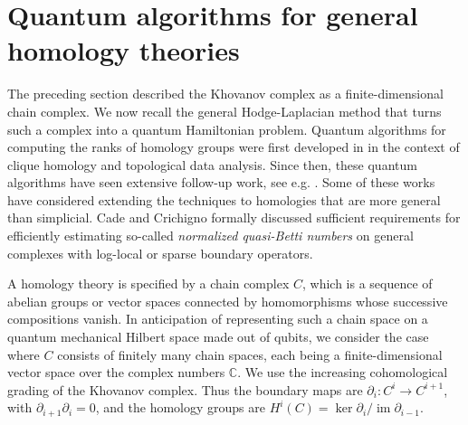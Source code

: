 \documentclass[a4paper,onecolumn,unpublished]{quantumarticle}
\theoremstyle{plain}
\theoremstyle{definition}
\theoremstyle{definition}
\numberwithin{equation}{section}
\renewcommand{\to}{\rightarrow}
\begin{document}
\section{Quantum algorithms for general homology theories}\label{sec:general_homology}
The preceding section described the Khovanov complex as a finite-dimensional chain complex. We now recall the general Hodge-Laplacian method that turns such a complex into a quantum Hamiltonian problem. Quantum algorithms for computing the ranks of homology groups were first developed in \cite{lloyd2016quantum} in the context of clique homology and topological data analysis. Since then, these quantum algorithms have seen extensive follow-up work, see e.g. \cite{quantumAdvantage,persistent,IBMresult,GoogleBettiBerry,AmazonBettiMcArdle,schmidhuber2023complexity,crichigno2022clique,king2023gapped,hayakawa2024quantum,gyurik_schmidhuber_2024quantum}. Some of these works have considered extending the techniques to homologies that are more general than simplicial. Cade and Crichigno \cite{cade2021complexity} formally discussed sufficient requirements for efficiently estimating so-called \emph{normalized quasi-Betti numbers} on general complexes with log-local or sparse boundary operators.

A homology theory is specified by a chain complex \(C\), which is a sequence of abelian groups or vector spaces connected by homomorphisms whose successive compositions vanish. In anticipation of representing such a chain space on a quantum mechanical Hilbert space made out of qubits, we consider the case where \(C\) consists of finitely many chain spaces, each being a finite-dimensional vector space over the complex numbers \(\mathbb C\). We use the increasing cohomological grading of the Khovanov complex. Thus the boundary maps are \(\partial_i:C^i\to C^{i+1}\), with \(\partial_{i+1}\partial_i=0\), and the homology groups are \(H^i(C)=\ker\partial_i/\operatorname{im}\partial_{i-1}\).
\end{document}
